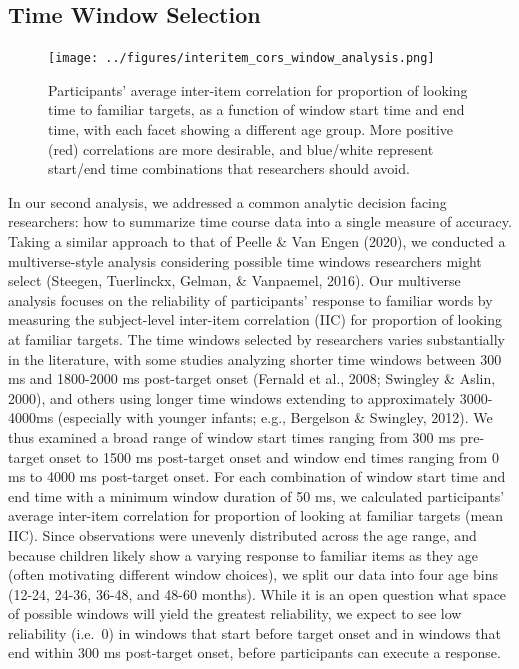 \documentclass[10pt, letterpaper]{article}
\begin{document}
\hypertarget{time-window-selection}{%
\subsection{Time Window Selection}\label{time-window-selection}}

\begin{figure} 
\texttt{[image: ../figures/interitem\_cors\_window\_analysis.png]}
\caption{Participants' average inter-item correlation for proportion of looking time to familiar targets, as a function of window start time and end time, with each facet showing a different age group. More positive (red) correlations are more desirable, and blue/white represent start/end time combinations that researchers should avoid.}
\label{fig:time_window}
\end{figure}

In our second analysis, we addressed a common analytic decision facing
researchers: how to summarize time course data into a single measure of
accuracy. Taking a similar approach to that of Peelle \& Van Engen
(2020), we conducted a multiverse-style analysis considering possible
time windows researchers might select (Steegen, Tuerlinckx, Gelman, \&
Vanpaemel, 2016). Our multiverse analysis focuses on the reliability of
participants' response to familiar words by measuring the subject-level
inter-item correlation (IIC) for proportion of looking at familiar
targets. The time windows selected by researchers varies substantially
in the literature, with some studies analyzing shorter time windows
between 300 ms and 1800-2000 ms post-target onset (Fernald et al., 2008;
Swingley \& Aslin, 2000), and others using longer time windows extending
to approximately 3000-4000ms (especially with younger infants; e.g.,
Bergelson \& Swingley, 2012). We thus examined a broad range of window
start times ranging from 300 ms pre-target onset to 1500 ms post-target
onset and window end times ranging from 0 ms to 4000 ms post-target
onset. For each combination of window start time and end time with a
minimum window duration of 50 ms, we calculated participants' average
inter-item correlation for proportion of looking at familiar targets
(mean IIC). Since observations were unevenly distributed across the age
range, and because children likely show a varying response to familiar
items as they age (often motivating different window choices), we split
our data into four age bins (12-24, 24-36, 36-48, and 48-60 months).
While it is an open question what space of possible windows will yield
the greatest reliability, we expect to see low reliability (i.e.~0) in
windows that start before target onset and in windows that end within
300 ms post-target onset, before participants can execute a response.
\end{document}
